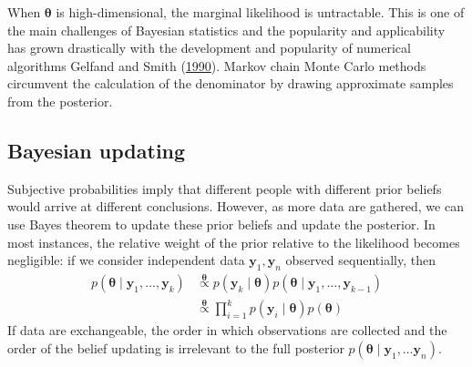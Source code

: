 \documentclass[
  11pt,
  letterpaper,
]{scrbook}
\theoremstyle{definition}
\theoremstyle{remark}
\begin{document}
When \(\boldsymbol{\theta}\) is high-dimensional, the marginal
likelihood is untractable. This is one of the main challenges of
Bayesian statistics and the popularity and applicability has grown
drastically with the development and popularity of numerical algorithms
Gelfand and Smith (\protect\hyperlink{ref-Gelfand.Smith:1990}{1990}).
Markov chain Monte Carlo methods circumvent the calculation of the
denominator by drawing approximate samples from the posterior.

\hypertarget{bayesian-updating}{%
\subsection{Bayesian updating}\label{bayesian-updating}}

Subjective probabilities imply that different people with different
prior beliefs would arrive at different conclusions. However, as more
data are gathered, we can use Bayes theorem to update these prior
beliefs and update the posterior. In most instances, the relative weight
of the prior relative to the likelihood becomes negligible: if we
consider independent data \(\boldsymbol{y}_1, \boldsymbol{y}_n\)
observed sequentially, then \begin{align*}
p(\boldsymbol{\theta} \mid \boldsymbol{y}_1, \ldots, \boldsymbol{y}_k) &\stackrel{\boldsymbol{\theta}}{\propto} p(\boldsymbol{y}_k \mid \boldsymbol{\theta}) p(\boldsymbol{\theta} \mid \boldsymbol{y}_1, \ldots, \boldsymbol{y}_{k-1})
\\ & \stackrel{\boldsymbol{\theta}}{\propto} \prod_{i=1}^k p(\boldsymbol{y}_i \mid \boldsymbol{\theta}) p(\boldsymbol{\theta})
\end{align*} If data are exchangeable, the order in which observations
are collected and the order of the belief updating is irrelevant to the
full posterior
\(p(\boldsymbol{\theta} \mid \boldsymbol{y}_1, \ldots \boldsymbol{y}_n)\).
\end{document}
